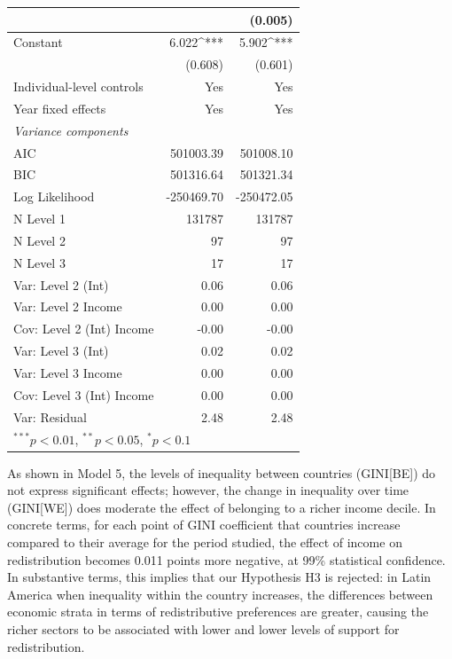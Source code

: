 \documentclass[utf8]{frontiersSCNS} %
\begin{document}
\begin{table}
\begin{tabular}{l D{.}{.}{7.5} D{.}{.}{7.5} }
                                    &             & (0.005)      \\
\hline
Constant                            & 6.022^{***}  & 5.902^{***}  \\
                                    & (0.608)      & (0.601)      \\
\hline
Individual-level controls           &     Yes     &     Yes     \\
Year fixed effects                  &     Yes     &     Yes     \\
\hline
\textit{Variance components}        &             &             \\
AIC                                 & 501003.39   & 501008.10   \\
BIC                                 & 501316.64   & 501321.34   \\
Log Likelihood                      & -250469.70  & -250472.05  \\
N Level 1                           & 131787      & 131787      \\
N Level 2                           & 97          & 97          \\
N Level 3                           & 17          & 17          \\
Var: Level 2 (Int)                  & 0.06        & 0.06        \\
Var: Level 2 Income                 & 0.00        & 0.00        \\
Cov: Level 2 (Int) Income           & -0.00       & -0.00       \\
Var: Level 3 (Int)                  & 0.02        & 0.02        \\
Var: Level 3 Income                 & 0.00        & 0.00        \\
Cov: Level 3 (Int) Income           & 0.00        & 0.00        \\
Var: Residual                       & 2.48        & 2.48        \\
\bottomrule
{}
\end{tabular}
\end{table}

As shown in Model 5, the levels of inequality between countries (GINI[BE]) do not express significant effects; however, the change in inequality over time (GINI[WE]) does moderate the effect of belonging to a richer income decile. In concrete terms, for each point of GINI coefficient that countries increase compared to their average for the period studied, the effect of income on redistribution becomes 0.011 points more negative, at 99\% statistical confidence. In substantive terms, this implies that our Hypothesis H3 is rejected: in Latin America when inequality within the country increases, the differences between economic strata in terms of redistributive preferences are greater, causing the richer sectors to be associated with lower and lower levels of support for redistribution.
\end{document}
